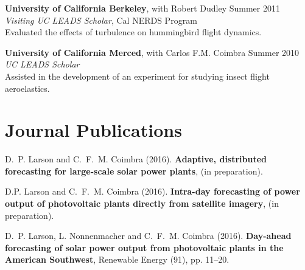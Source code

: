\documentclass[]{res}
\begin{document}
\begin{resume}
\textbf{University of California Berkeley}, with Robert Dudley \hfill Summer 2011 \\
\textit{Visiting UC LEADS Scholar}, Cal NERDS Program \\
Evaluated the effects of turbulence on hummingbird flight dynamics.

\textbf{University of California Merced}, with Carlos F.M. Coimbra \hfill Summer 2010 \\
\textit{UC LEADS Scholar} \\
Assisted in the development of an experiment for studying insect flight aeroelastics.


%


\section{Journal Publications}
\vspace{0.1in}

D.~P. Larson and C.~F.~M. Coimbra (2016). \textbf{Adaptive, distributed forecasting for large-scale solar power plants}, (in preparation).

D.P. Larson and C.~F.~M. Coimbra (2016). \textbf{Intra-day forecasting of power output of photovoltaic plants directly from satellite imagery}, (in preparation).

D.~P. Larson, L. Nonnenmacher and C.~F.~M. Coimbra (2016). \textbf{Day-ahead forecasting of solar power output from photovoltaic plants in the American Southwest}, Renewable Energy (91), pp. 11--20.



\end{resume}
\end{document}
